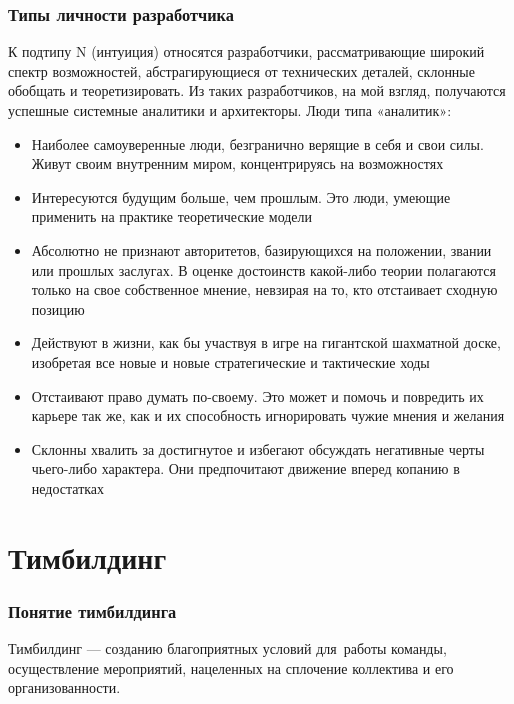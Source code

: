 \documentclass{../industrial-development}
\begin{document}
\begin{frame} \frametitle{Типы личности разработчика}
К подтипу N (интуиция) относятся разработчики, рассматривающие широкий спектр возможностей, абстрагирующиеся от технических деталей, склонные обобщать и теоретизировать. Из таких разработчиков, на мой взгляд, получаются успешные системные аналитики и архитекторы. Люди типа «аналитик»:

\begin{itemize}
\item Наиболее самоуверенные люди, безгранично верящие в себя и свои силы. Живут своим внутренним миром, концентрируясь на возможностях
\item Интересуются будущим больше, чем прошлым. Это люди, умеющие применить на практике теоретические модели
\item Абсолютно не признают авторитетов, базирующихся на положении, звании или прошлых заслугах. В оценке достоинств какой-либо теории полагаются только на свое собственное мнение, невзирая на то, кто отстаивает сходную позицию
\item Действуют в жизни, как бы участвуя в игре на гигантской шахматной доске, изобретая все новые и новые стратегические и тактические ходы
\item Отстаивают право думать по-своему. Это может и помочь и повредить их карьере так же, как и их способность игнорировать чужие мнения и желания
\item Склонны хвалить за достигнутое и избегают обсуждать негативные черты чьего-либо характера. Они предпочитают движение вперед копанию в недостатках

\end{itemize}
\end{frame}






\section{Тимбилдинг}

\begin{frame} \frametitle{Понятие тимбилдинга}
\begin{block}{}
Тимбилдинг --- созданию благоприятных условий для~работы команды, осуществление мероприятий, нацеленных на сплочение коллектива и его организованности.
\end{block}
\end{frame}
\end{document}
